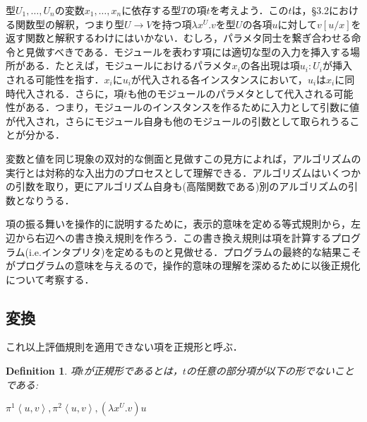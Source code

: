 \documentclass[a4paper,10pt,platex]{jsarticle}
\newtheorem{definition}{Definition}
\begin{document}
型$U_{1},\ldots,U_{n}$の変数$x_{1},\ldots, x_{n}$に依存する型$T$の項$t$を考えよう．この$t$は，\S3.2における関数型の解釈，つまり型$U\rightarrow V$を持つ項$\lambda x^{U}. v$を型$U$の各項$u$に対して$v\left[u/x\right]$を返す関数と解釈するわけにはいかない．むしろ，パラメタ同士を繋ぎ合わせる命令と見做すべきである．モジュールを表わす項には適切な型の入力を挿入する場所がある．たとえば，モジュールにおけるパラメタ$x_{i}$の各出現は項$u_{i}:U_{i}$が挿入される可能性を指す．$x_{i}$に$u_{i}$が代入される各インスタンスにおいて，$u_{i}$は$x_{i}$に同時代入される．さらに，項$t$も他のモジュールのパラメタとして代入される可能性がある．つまり，モジュールのインスタンスを作るために入力として引数に値が代入され，さらにモジュール自身も他のモジュールの引数として取られうることが分かる．

変数と値を同じ現象の双対的な側面と見做すこの見方によれば，アルゴリズムの実行とは対称的な入出力のプロセスとして理解できる．アルゴリズムはいくつかの引数を取り，更にアルゴリズム自身も(高階関数である)別のアルゴリズムの引数となりうる．

項の振る舞いを操作的に説明するために，表示的意味を定める等式規則から，左辺から右辺への書き換え規則を作ろう．この書き換え規則は項を計算するプログラム(i.e.インタプリタ)を定めるものと見做せる．プログラムの最終的な結果こそがプログラムの意味を与えるので，操作的意味の理解を深めるために以後正規化について考察する．

\subsection{変換}
これ以上評価規則を適用できない項を正規形と呼ぶ．
 \begin{definition}
 項$t$が正規形であるとは，$t$の任意の部分項が以下の形でないことである:
 
 $\pi^{1}\left<u, v\right>, \pi^{2}\left<u, v\right>, (\lambda x^{U}.v)u$
 \end{definition}
\end{document}

